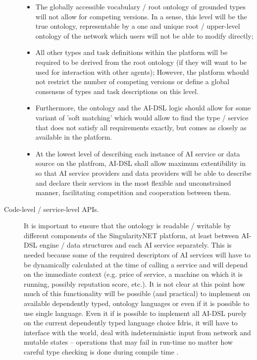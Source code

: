\documentclass[]{report}
\begin{document}
\begin{description}
  \begin{itemize} \item The globally accessible vocabulary / root ontology of
  grounded types will not allow for competing versions. In a sense, this level
  will be the true ontology, representable by a one and unique root /
  upper-level ontology of the network which users will not be able to modify
  directly; \item All other types and task definitions within the platform will
  be required to be derived from the root ontology (if they will want to be used
  for interaction with other agents); However, the platform whould not restrict
  the number of competing versions or define a global consensus  of types and
  task descriptions on this level. \item Furthermore, the ontology and the
  AI-DSL logic should allow for some variant of 'soft matching' which would
  allow to find the type / service that does not satisfy all requirements
  exactly, but comes as closely as available in the platform. \item At the
  lowest level of describing each instance of AI service or data source on the
  platfrom, AI-DSL shall allow maximum extentibility in so that AI service
  providers and data providers will be able to describe and declare their
  services in the most flexible and unconstrained manner, facilitating
  competition and cooperation between them. \end{itemize}

  \item[Code-level / service-level APIs.] It is important to ensure that the
  ontology is readable / writable by different components of the SingularityNET
  platform, at least between AI-DSL engine / data structures and each AI service
  separately. This is needed because some of the required descriptors of AI
  services will have to be dynamically calculated at the time of calling a
  service and will depend on the immediate context (e.g. price of service, a
  machine on which it is running, possibly reputation score, etc.). It is not
  clear at this point how much of this functionality will be possible (and
  practical) to implement on available dependently typed, ontology languages or
  even if it is possible to use single language. Even it if is possible to
  implement all AI-DSL purely on the current dependently typed language choice
  Idris, it will have to interface with the world, deal with indeterministic
  input from network and mutable states -- operations that may fail in run-time
  no matter how careful type checking is done during compile time
  \cite{brady_resource-dependent_2015}.


\end{description}
\end{document}
